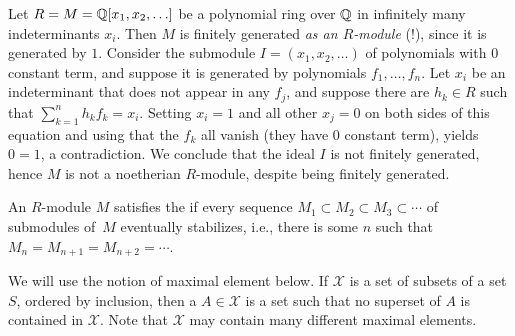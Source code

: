 \begin{example}
Let $R=M=\mathbb{Q}[x_1,x_2,\ldots]$ be a polynomial ring over $\mathbb{Q}$ in
infinitely many indeterminants $x_i$.  Then $M$ is finitely generated
{\em as an $R$-module} (!), since it is generated by $1$.  Consider
the submodule $I=(x_1,x_2,\ldots)$ of polynomials with $0$ constant
term, and suppose it is generated by polynomials $f_1, \ldots, f_n$.
Let $x_i$ be an indeterminant that does not appear in any $f_j$, and
suppose there are $h_k\in R$ such that $\sum_{k=1}^n h_k f_k = x_i$.
Setting $x_i=1$ and all other $x_j=0$ on both sides of this equation
and using that the $f_k$ all vanish (they have 0 constant term),
yields $0=1$, a contradiction.  We conclude that the ideal $I$ is not
finitely generated, hence $M$ is not a noetherian $R$-module, despite
being finitely generated.
\end{example}

\begin{definition}
An $R$-module $M$ satisfies the  if
every sequence $M_1\subset M_2 \subset M_3 \subset \cdots$ of
submodules of~$M$ eventually stabilizes, i.e., there is some $n$ such
that $M_n=M_{n+1}=M_{n+2}=\cdots$.
\end{definition}
We will use the notion of maximal element below.  If $\mathcal{X}$ is
a set of subsets of a set $S$, ordered by inclusion, then a
 $A\in \mathcal{X}$ is a set such that no superset
of $A$ is contained in $\mathcal{X}$.  Note that $\mathcal{X}$ may 
contain many different maximal elements.

